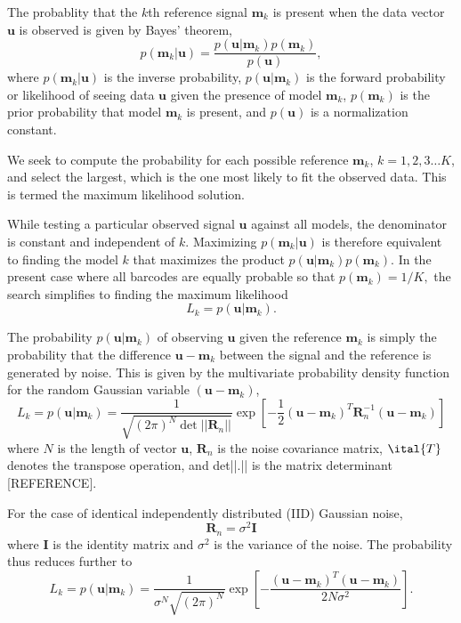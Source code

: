 The probablity that the $k$th reference signal $\mathbf{m}_k$ is present when the data vector $\mathbf{u}$ is observed is given by Bayes' theorem,
\begin{equation}\label{eq:Bayes}
p(\mathbf{m}_k|\mathbf{u}) = \frac{p(\mathbf{u}|\mathbf{m}_k)p(\mathbf{m}_k)} {p(\mathbf{u})},
\end{equation}
where $p(\mathbf{m}_k|\mathbf{u})$ is the inverse probability, $p(\mathbf{u}|\mathbf{m}_k)$ is the forward probability or likelihood of seeing data $\mathbf{u}$ given the presence of model $\mathbf{m}_k$, $p(\mathbf{m}_k)$ is the prior probability that model $\mathbf{m}_k$ is present, and $p(\mathbf{u})$ is a normalization constant.

We seek to compute the probability for each possible reference $\mathbf{m}_k$, $k=1,2,3 \ldots K$, and select the largest, which is the one most likely to fit the observed data. This is termed the maximum likelihood solution.

While testing a particular observed signal $\mathbf{u}$ against all models, the denominator is constant and independent of $k$. Maximizing $p(\mathbf{m}_k|\mathbf{u})$ is therefore equivalent to finding the model $k$ that maximizes the product  $p(\mathbf{u}|\mathbf{m}_k)p(\mathbf{m}_k)$.
In the present case where all barcodes are equally probable so that
$p(\mathbf{m}_k)=1/K,$ 
the search simplifies to finding the maximum likelihood 
\begin{equation}
L_k = p(\mathbf{u}|\mathbf{m}_k).
\end{equation}



The probability $p(\mathbf{u}|\mathbf{m}_k)$ of observing $\mathbf{u}$ given the reference $\mathbf{m}_k$ is simply the probability that the difference $\mathbf{u}-\mathbf{m}_k$ between the signal and the reference is generated by noise. This is given by the multivariate probability density function for the random Gaussian variable $(\mathbf{u}-\mathbf{m}_k)$, 
\begin{equation}\label{eq:Main}
L_k = p(\mathbf{u}|\mathbf{m}_k) = \frac{1}{  \sqrt{ (2\pi)^N \det || \mathbf{R}_n||} } \exp\left[ -\frac{1}{2}  (\mathbf{u}-\mathbf{m}_k)^T \mathbf{R}_n^{-1} (\mathbf{u}-\mathbf{m}_k) \right]
\end{equation}
where $N$ is the length of vector $\mathbf{u}$, $\mathbf{R}_n$ is the noise covariance matrix, $\ital{T}$ denotes the transpose operation, and det||.|| is the matrix determinant [REFERENCE].
 
For the case of identical independently distributed (IID) Gaussian noise, 
\begin{equation}
\mathbf{R}_n=\sigma^2 \mathbf{I}
\end{equation}
where $\mathbf{I}$ is the identity matrix and $\sigma^2$ is the variance of the noise. The probability thus reduces further to
\begin{equation}\label{eq:iidEnergy}
L_k = p(\mathbf{u}|\mathbf{m}_k) = \frac{1}{  \sigma^N \sqrt{ (2\pi)^N}   } \exp\left[ -\frac{(\mathbf{u}-\mathbf{m}_k)^T(\mathbf{u}-\mathbf{m}_k)} {2 N \sigma^2 } \right].
\end{equation}

